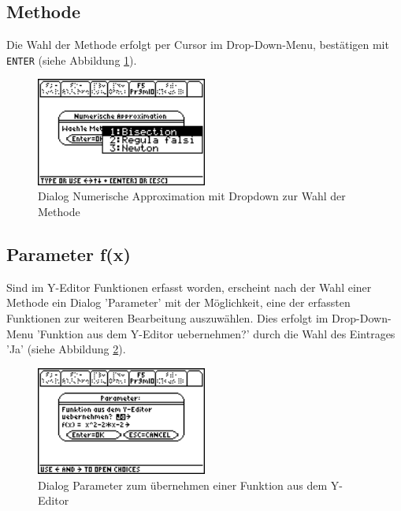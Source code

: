\documentclass[a4paper,10pt]{scrreprt}
\begin{document}
\subsection*{Methode}
Die Wahl der Methode erfolgt per Cursor im Drop-Down-Menu, best\"atigen mit \verb|ENTER| (siehe Abbildung \ref{fig:MethodeApproximation}).
\begin{figure}[h]
  \centering
  \includegraphics[width=0.5\textwidth]{img/nummeth_image010.png}
  \caption{Dialog Numerische Approximation mit Dropdown zur Wahl der Methode}
  \label{fig:MethodeApproximation}
\end{figure}

\newpage
\subsection*{Parameter f(x)}
Sind im Y\hbox{-}Editor Funktionen erfasst worden, erscheint nach der Wahl einer Methode ein Dialog 'Parameter’ mit der M\"oglichkeit, eine der erfassten Funktionen zur weiteren Bearbeitung auszuw\"ahlen. Dies erfolgt im Drop-Down-Menu 'Funktion aus dem Y\hbox{-}Editor uebernehmen?’ durch die Wahl des Eintrages 'Ja’ (siehe Abbildung \ref{fig:ParameterFxFrage}).
\begin{figure}[h]
  \centering
  \includegraphics[width=0.5\textwidth]{img/nummeth_image014.png}
  \caption{Dialog Parameter zum \"ubernehmen einer Funktion aus dem Y\hbox{-}Editor}
  \label{fig:ParameterFxFrage}
\end{figure}
\end{document}
